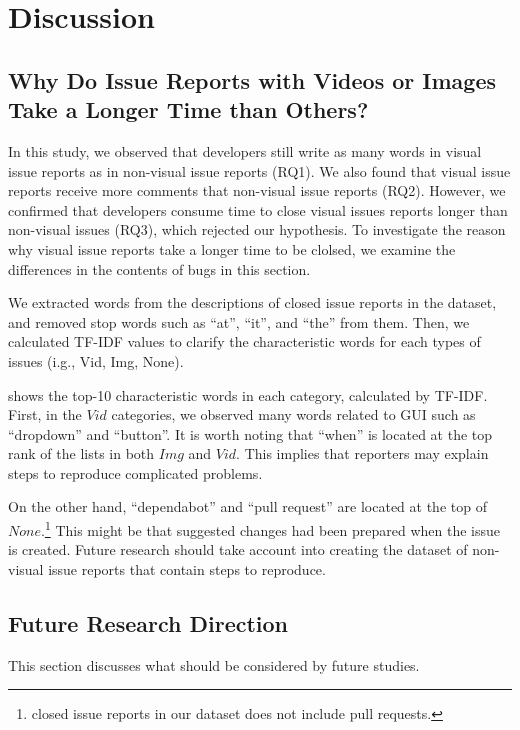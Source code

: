 \section{Discussion}
%
\subsection{Why Do Issue Reports with Videos or Images Take a Longer Time than Others?}
In this study, we observed that developers still write as many words in visual issue reports as in non-visual issue reports (RQ1). 
We also found that visual issue reports receive more comments that non-visual issue reports (RQ2). 
However, we confirmed that developers consume time to close visual issues reports longer than non-visual issues (RQ3), which rejected our hypothesis. 
To investigate the reason why visual issue reports take a longer time to be clolsed, we examine the differences in the contents of bugs in this section. 

We extracted words from the descriptions of closed issue reports in the dataset, and  removed stop words such as ``at'', ``it'', and ``the'' from them. 
Then, we calculated TF-IDF values to clarify the characteristic words for each types of issues (i.g., Vid, Img, None). 

 shows the top-10 characteristic words in each category, calculated by TF-IDF.
First, in the $Vid$ categories, we observed many words  related to GUI such as ``dropdown'' and ``button''. It is worth noting that ``when'' is located at the top rank of the lists in both $Img$ and $Vid$. 
This implies that reporters may explain steps to reproduce complicated problems. 

On the other hand, ``dependabot'' and ``pull request'' are located at the top of  $None$.\footnote{closed issue reports in our dataset does not include pull requests.} 
This might be that suggested changes had been prepared when the issue is created. 
Future research should take account into creating the dataset of non-visual issue reports that contain steps to reproduce. 



\subsection{Future Research Direction}
This section discusses what should be considered by future studies. 

